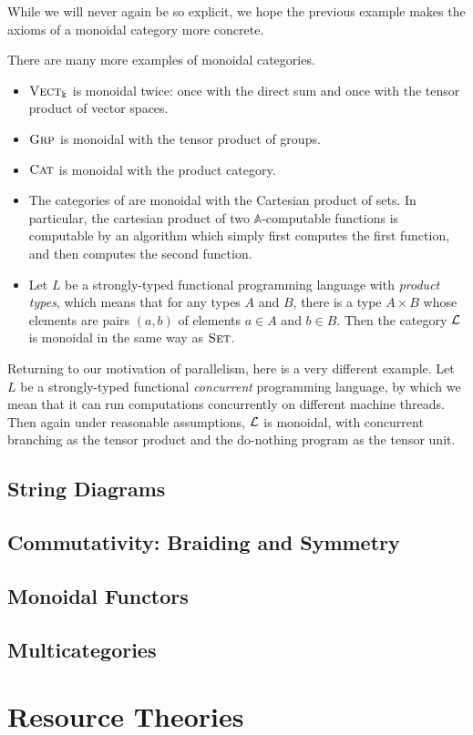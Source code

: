 While we will never again be so explicit, we hope the previous example makes the
axioms of a monoidal category more concrete.

\begin{ex}
  There are many more examples of monoidal categories.
  \begin{itemize}
    \item ${\textsc{\text{Vect}}}_\Bbbk$ is monoidal twice: once with the direct sum and once
      with the tensor product of vector spaces.
    \item ${\textsc{\text{Grp}}}$ is monoidal with the tensor product of groups.
    \item ${\textsc{\text{Cat}}}$ is monoidal with the product category.
    \item The categories of 
      are monoidal with the Cartesian product of sets. In particular, the
      cartesian product of two $\mathbb{A}$-computable functions is computable
      by an algorithm which simply first computes the first function, and then
      computes the second function.
    \item Let $L$ be a strongly-typed functional programming language with
      \emph{product types}, which means that for any types $A$ and $B$, there is
      a type $A\times B$ whose elements are pairs $(a, b)$ of elements $a\in A$
      and $b\in B$. Then the category $\mathcal{L}$ is monoidal in the same way as
      ${\textsc{\text{Set}}}$.
  \end{itemize}
\end{ex}

\begin{ex}
  Returning to our motivation of parallelism, here is a very different example.
  Let $L$ be a strongly-typed functional \emph{concurrent} programming language,
  by which we mean that it can run computations concurrently on different
  machine threads. Then again under reasonable assumptions, $\mathcal{L}$ is monoidal,
  with concurrent branching as the tensor product and the do-nothing program as
  the tensor unit.
\end{ex}

\subsection{String Diagrams}

\subsection{Commutativity: Braiding and Symmetry}

\subsection{Monoidal Functors}

\subsection{Multicategories}

\section{Resource Theories}
